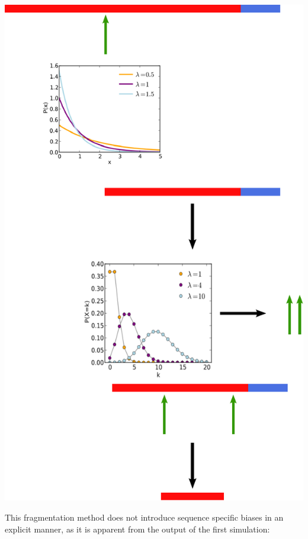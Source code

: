 \begin{center}
\includegraphics[scale=0.6]{pix/pre_prim.pdf}
\end{center}

This fragmentation method does not introduce sequence specific biases in an explicit manner, as it is apparent from the output of the first simulation:

